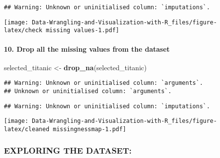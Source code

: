 \documentclass[
]{article}
\newenvironment{Shaded}{\begin{snugshade}}{\end{snugshade}}
\newcommand{\FunctionTok}[1]{\textcolor[rgb]{0.13,0.29,0.53}{\textbf{#1}}}
\newcommand{\NormalTok}[1]{#1}
\newcommand{\OtherTok}[1]{\textcolor[rgb]{0.56,0.35,0.01}{#1}}
\begin{document}
\begin{verbatim}
## Warning: Unknown or uninitialised column: `imputations`.
\end{verbatim}

\texttt{[image: Data-Wrangling-and-Visualization-with-R\_files/figure-latex/check missing values-1.pdf]}

\paragraph{10. Drop all the missing values from the
dataset}\label{drop-all-the-missing-values-from-the-dataset}

\begin{Shaded}
\begin{Highlighting}[]
\NormalTok{selected\_titanic }\OtherTok{\textless{}{-}} \FunctionTok{drop\_na}\NormalTok{(selected\_titanic)}
\end{Highlighting}
\end{Shaded}

\begin{verbatim}
## Warning: Unknown or uninitialised column: `arguments`.
## Unknown or uninitialised column: `arguments`.
\end{verbatim}

\begin{verbatim}
## Warning: Unknown or uninitialised column: `imputations`.
\end{verbatim}

\texttt{[image: Data-Wrangling-and-Visualization-with-R\_files/figure-latex/cleaned missingnessmap-1.pdf]}

\subsubsection{EXPLORING THE DATASET:}\label{exploring-the-dataset}
\end{document}
